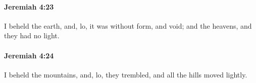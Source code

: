 		\paragraph{Jeremiah 4:23} %
			\label{JEREMIAH-4-23}

			I beheld the earth, and, lo, it was without form, and void; and the heavens, and they had no light.


		\paragraph{Jeremiah 4:24} %
			\label{JEREMIAH-4-24}

			I beheld the mountains, and, lo, they trembled, and all the hills moved lightly.


